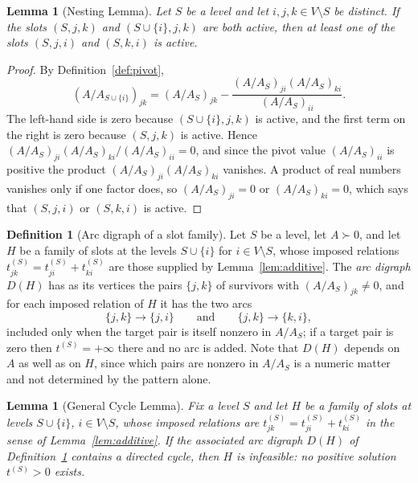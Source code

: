 \documentclass[11pt]{article}
\theoremstyle{plain}
\newtheorem{lemma}[theorem]{Lemma}
\theoremstyle{definition}
\newtheorem{definition}[theorem]{Definition}
\begin{document}
\begin{aiblock}
\begin{lemma}[Nesting Lemma]\label{lem:nesting}
Let $S$ be a level and let $i,j,k\in V\setminus S$ be distinct. If the slots $(S,j,k)$ and
$(S\cup\{i\},j,k)$ are both active, then at least one of the slots $(S,j,i)$ and $(S,k,i)$ is active.
\end{lemma}

\begin{proof}
By Definition~\ref{def:pivot},
\[
  (A/A_{S\cup\{i\}})_{jk}=(A/A_S)_{jk}-\frac{(A/A_S)_{ji}(A/A_S)_{ki}}{(A/A_S)_{ii}} .
\]
The left-hand side is zero because $(S\cup\{i\},j,k)$ is active, and the first term on the right is
zero because $(S,j,k)$ is active. Hence
$(A/A_S)_{ji}(A/A_S)_{ki}/(A/A_S)_{ii}=0$, and since the pivot value $(A/A_S)_{ii}$ is positive the
product $(A/A_S)_{ji}(A/A_S)_{ki}$ vanishes. A product of real numbers vanishes only if one factor
does, so $(A/A_S)_{ji}=0$ or $(A/A_S)_{ki}=0$, which says that $(S,j,i)$ or $(S,k,i)$ is active.
\end{proof}


\begin{definition}[Arc digraph of a slot family]\label{def:arcdigraph}
Let $S$ be a level, let $A\succ0$, and let $H$ be a family of slots at the levels $S\cup\{i\}$ for
$i\in V\setminus S$, whose imposed relations $t^{(S)}_{jk}=t^{(S)}_{ji}+t^{(S)}_{ki}$ are those
supplied by Lemma~\ref{lem:additive}. The \emph{arc digraph} $D(H)$ has as its vertices the pairs
$\{j,k\}$ of survivors with $(A/A_S)_{jk}\neq0$, and for each imposed relation of $H$ it has the two
arcs
\[
  \{j,k\}\to\{j,i\}\qquad\text{and}\qquad \{j,k\}\to\{k,i\},
\]
included only when the target pair is itself nonzero in $A/A_S$; if a target pair is zero then
$t^{(S)}=+\infty$ there and no arc is added. Note that $D(H)$ depends on $A$ as well as on $H$, since
which pairs are nonzero in $A/A_S$ is a numeric matter and not determined by the pattern alone.
\end{definition}


\begin{lemma}[General Cycle Lemma]\label{lem:cycle}
Fix a level $S$ and let $H$ be a family of slots at levels $S\cup\{i\}$, $i\in V\setminus S$, whose
imposed relations are $t^{(S)}_{jk}=t^{(S)}_{ji}+t^{(S)}_{ki}$ in the sense of
Lemma~\ref{lem:additive}. If the associated arc digraph $D(H)$ of Definition~\ref{def:arcdigraph}
contains a directed cycle, then $H$ is infeasible: no positive solution $t^{(S)}>0$ exists.
\end{lemma}



\end{aiblock}
\end{document}
